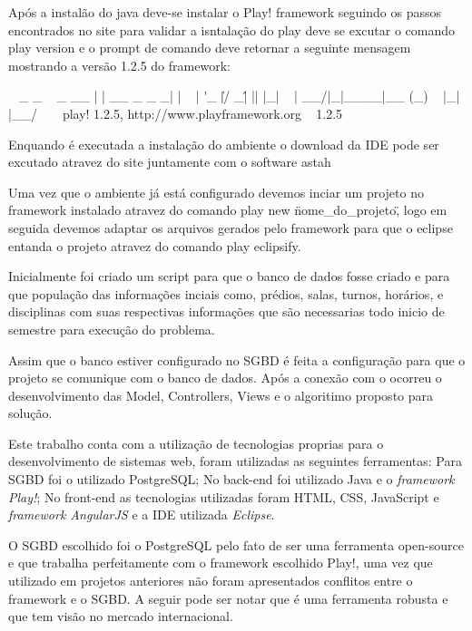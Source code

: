 Após a instalão do java deve-se instalar o Play! framework seguindo os passos encontrados no site \cite{play} para validar a isntalação do play deve se excutar o comando play version e o prompt de comando deve retornar a seguinte mensagem mostrando a versão 1.2.5 do framework:

~        _            _
~  _ __ | | __ _ _  _| |
~ | \'_ \| |/ _\' | || |_|
~ |  __/|_|\____|\__ (_)
~ |_|            |__/
~
~ play! 1.2.5, http://www.playframework.org
~
1.2.5

Enquando é executada a instalação do ambiente o download da IDE pode ser excutado atravez do site \cite{eclipse} juntamente com o software astah \cite{astah}\par

Uma vez que o ambiente já está configurado devemos inciar um projeto no framework instalado atravez do comando play new \"nome_do_projeto\", logo em seguida devemos adaptar os arquivos gerados pelo framework para que o eclipse entanda o projeto atravez do comando play eclipsify.


Inicialmente foi criado um script para que o banco de dados fosse criado e para que população das informações inciais como, prédios, salas, turnos, horários, e disciplinas com suas respectivas informações que são necessarias todo inicio de semestre para execução do problema.

Assim que o banco estiver configurado no SGBD é feita a configuração para que o projeto se comunique com o banco de dados. Após a conexão com o ocorreu o desenvolvimento das Model, Controllers, Views e o algoritimo proposto para solução.



Este trabalho conta com a utilização de tecnologias proprias para o desenvolvimento de sistemas web, foram utilizadas as seguintes ferramentas: Para SGBD foi o utilizado PostgreSQL; No back-end foi utilizado Java e o \textit{framework Play!}; No front-end as tecnologias utilizadas foram HTML, CSS, JavaScript e \textit{framework AngularJS} e a IDE utilizada \textit{Eclipse}.\par


O SGBD escolhido foi o PostgreSQL pelo fato de ser uma ferramenta open-source e que trabalha perfeitamente com o framework escolhido Play!, uma vez que utilizado em projetos anteriores não foram apresentados conflitos entre o framework e o SGBD. A seguir pode ser notar que é uma ferramenta robusta e que tem visão no mercado internacional.\par

